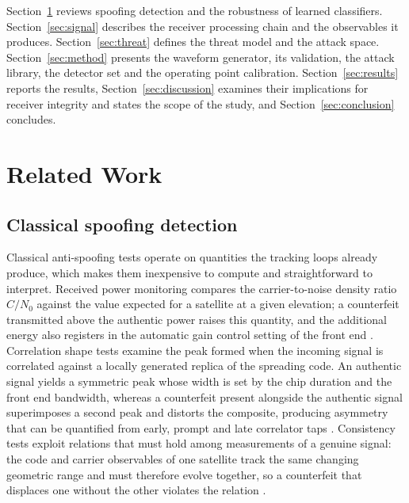 \documentclass[pdflatex,sn-basic]{sn-jnl}
\theoremstyle{thmstyleone}
\theoremstyle{thmstyletwo}
\theoremstyle{thmstylethree}
\begin{document}
Section~\ref{sec:related} reviews spoofing detection and the robustness of learned
classifiers. Section~\ref{sec:signal} describes the receiver processing chain and the
observables it produces. Section~\ref{sec:threat} defines the threat model and the attack
space. Section~\ref{sec:method} presents the waveform generator, its validation, the attack
library, the detector set and the operating point calibration.
Section~\ref{sec:results} reports the results, Section~\ref{sec:discussion} examines their
implications for receiver integrity and states the scope of the study, and
Section~\ref{sec:conclusion} concludes.

\section{Related Work}
\label{sec:related}

\subsection{Classical spoofing detection}
\label{sec:rw_classical}

Classical anti-spoofing tests operate on quantities the tracking loops already produce,
which makes them inexpensive to compute and straightforward to interpret. Received power
monitoring compares the carrier-to-noise density ratio $C/N_0$ against the value expected
for a satellite at a given elevation; a counterfeit transmitted above the authentic power
raises this quantity, and the additional energy also registers in the automatic gain
control setting of the front end \citep{akos2012gnss}. Correlation shape tests examine the
peak formed when the incoming signal is correlated against a locally generated replica of
the spreading code. An authentic signal yields a symmetric peak whose width is set by the
chip duration and the front end bandwidth, whereas a counterfeit present alongside the
authentic signal superimposes a second peak and distorts the composite, producing
asymmetry that can be quantified from early, prompt and late correlator taps
\citep{psiaki2016gnss}. Consistency tests exploit relations that must hold among
measurements of a genuine signal: the code and carrier observables of one satellite track
the same changing geometric range and must therefore evolve together, so a counterfeit
that displaces one without the other violates the relation \citep{psiaki2016gnss}.
\end{document}
